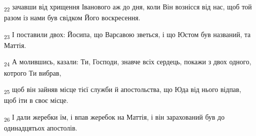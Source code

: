 \begin{tcolorbox}
\textsubscript{22} зачавши від хрищення Іванового аж до дня, коли Він вознісся від нас, щоб той разом із нами був свідком Його воскресення.
\end{tcolorbox}
\begin{tcolorbox}
\textsubscript{23} І поставили двох: Йосипа, що Варсавою зветься, і що Юстом був названий, та Маттія.
\end{tcolorbox}
\begin{tcolorbox}
\textsubscript{24} А молившись, казали: Ти, Господи, знавче всіх сердець, покажи з двох одного, котрого Ти вибрав,
\end{tcolorbox}
\begin{tcolorbox}
\textsubscript{25} щоб він зайняв місце тієї служби й апостольства, що Юда від нього відпав, щоб іти в своє місце.
\end{tcolorbox}
\begin{tcolorbox}
\textsubscript{26} І дали жеребки їм, і впав жеребок на Маттія, і він зарахований був до одинадцятьох апостолів.
\end{tcolorbox}
